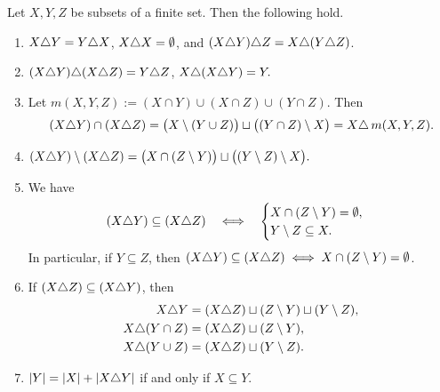 \documentclass[a4paper,leqno]{amsart}
\begin{document}
\begin{lem}\label{lem:symmetric-difference-identities}
Let $X,Y,Z$ be subsets of a finite set. Then the following hold.
\begin{enumerate}[label=\textup{(\arabic*)},ref=\arabic*]

\item\label{itm:symdiff-associativity} $X{\mathbin{\triangle}} Y=Y{\mathbin{\triangle}} X$, $X{\mathbin{\triangle}} X=\emptyset$, and $(X{\mathbin{\triangle}} Y){\mathbin{\triangle}} Z=X{\mathbin{\triangle}}(Y{\mathbin{\triangle}} Z)$.

\item\label{itm:symdiff-cancellation} $(X{\mathbin{\triangle}} Y){\mathbin{\triangle}}(X{\mathbin{\triangle}} Z)=Y{\mathbin{\triangle}} Z$, $X{\mathbin{\triangle}}(X{\mathbin{\triangle}} Y)=Y.$

\item\label{itm:symdiff-intersection} Let $m(X,Y,Z):=(X\cap Y)\cup (X\cap Z)\cup (Y\cap Z)$.
Then $$(X{\mathbin{\triangle}} Y)\cap (X{\mathbin{\triangle}} Z) = \bigl(X\setminus(Y\cup Z)\bigr)\sqcup\bigl((Y\cap Z)\setminus X\bigr) = X{\mathbin{\triangle}}\, m(X,Y,Z).$$

\item\label{itm:symdiff-difference} $ (X{\mathbin{\triangle}} Y)\setminus(X{\mathbin{\triangle}} Z) =\bigl(X\cap(Z\setminus Y)\bigr) \sqcup\bigl((Y\setminus Z)\setminus X\bigr).$

\item\label{itm:symdiff-inclusion} We have 
\[
(X{\mathbin{\triangle}} Y)\subseteq(X{\mathbin{\triangle}} Z)\quad \Longleftrightarrow\quad 
 \begin{cases}
     X\cap(Z\setminus Y)=\emptyset,\\
     Y\setminus Z\subseteq X.
 \end{cases}
\]
In particular, if $Y\subseteq Z$, then $ (X{\mathbin{\triangle}} Y)\subseteq(X{\mathbin{\triangle}} Z) \;\Longleftrightarrow\; X\cap(Z\setminus Y)=\emptyset$.

\item\label{itm:symdiff-interval} If $(X{\mathbin{\triangle}} Z)\subseteq(X{\mathbin{\triangle}} Y)$, then
\[
\begin{aligned}
 X{\mathbin{\triangle}} Y&=(X{\mathbin{\triangle}} Z)\sqcup(Z\setminus Y)\sqcup(Y\setminus Z),\\
 X{\mathbin{\triangle}}(Y\cap Z)&=(X{\mathbin{\triangle}} Z)\sqcup(Z\setminus Y),\\
 X{\mathbin{\triangle}}(Y\cup Z)&=(X{\mathbin{\triangle}} Z)\sqcup(Y\setminus Z).
\end{aligned}
\]

\item\label{itm:symdiff-cardinality} $|Y|=|X|+|X{\mathbin{\triangle}} Y|$ if and only if  $X\subseteq Y$.
\end{enumerate}

\end{lem}
\end{document}
